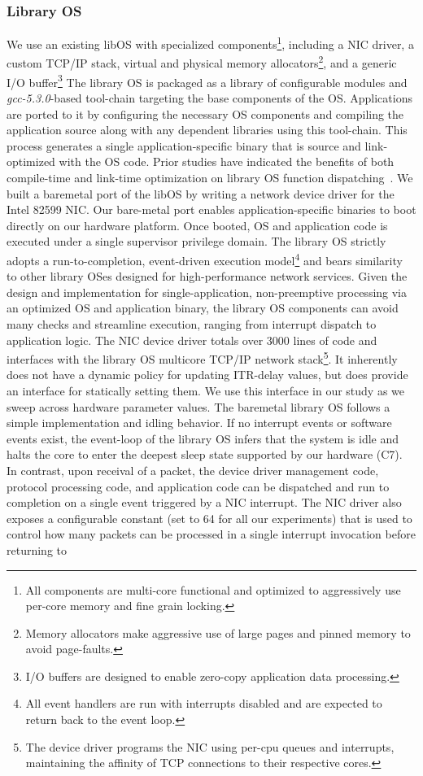\subsubsection{Library OS}
\label{sec:OS_libos}
We use an existing libOS with specialized components\footnote{ All components are multi-core functional and optimized to aggressively use per-core memory and fine grain locking.}, including a NIC driver, a custom TCP/IP stack, virtual and physical memory allocators\footnote{Memory allocators make aggressive use of large pages and pinned memory to avoid page-faults.}, and a generic I/O buffer\footnote{I/O buffers are designed to enable zero-copy application data processing.} The library OS is packaged as a library of configurable modules and \textit{gcc-5.3.0}-based tool-chain targeting the base components of the OS. Applications are ported to it by configuring the necessary OS components and compiling the application source along with any dependent libraries using this tool-chain. This process generates a single application-specific binary that is source and link-optimized with the OS code. Prior studies have indicated the benefits of both compile-time and link-time optimization on library OS function dispatching~\cite{ebbrt}. We built a baremetal port of the libOS by writing a network device driver for the Intel 82599 NIC. Our bare-metal port enables application-specific binaries to boot directly on our hardware platform. Once booted, OS and application code is executed under a single supervisor privilege domain. The library OS strictly adopts a run-to-completion, event-driven execution model\footnote{All event handlers are run with interrupts disabled and are expected to return back to the event loop.} and bears similarity to other library OSes designed for high-performance network services\cite{ix,seda,arrakis,ebbrt}. Given the design and implementation for single-application, non-preemptive processing via an optimized OS and application binary, the library OS components can avoid many checks and streamline execution, ranging from interrupt dispatch to application logic. The NIC device driver totals over 3000 lines of code and interfaces with the library OS multicore TCP/IP network stack\footnote{The device driver programs the NIC using per-cpu queues and interrupts, maintaining the affinity of TCP connections to their respective cores.}. It inherently does not have a dynamic policy for updating ITR-delay values, but does provide an interface for statically setting them. We use this interface in our study as we sweep across hardware parameter values. The baremetal library OS follows a simple implementation and idling behavior. If no interrupt events or software events exist, the event-loop of the library OS infers that the system is idle and halts the core to enter the deepest sleep state supported by our hardware (C7). In contrast, upon receival of a packet, the device driver management code, protocol processing code, and application code can be dispatched and run to completion on a single event triggered by a NIC interrupt. The NIC driver also exposes a configurable constant (set to 64 for all our experiments) that is used to control how many packets can be processed in a single interrupt invocation before returning to 